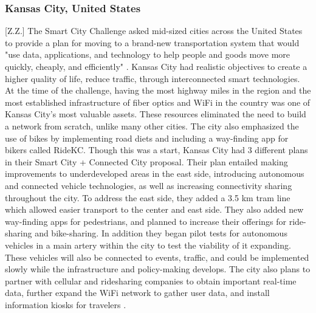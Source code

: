 \documentclass[12pt]{article}                       %
\begin{document}
\subsubsection{Kansas City, United States}[Z.Z.]
The Smart City Challenge asked mid-sized cities across the United States to provide a plan for moving to a brand-new transportation system that would "use data, applications, and technology to help people and goods move more quickly, cheaply, and efficiently" \cite{2016BeyondChallengeb}. Kansas City had realistic objectives to create a higher quality of life, reduce traffic, through interconnected smart technologies. At the time of the challenge, having the most highway miles in the region and the most established infrastructure of fiber optics and WiFi in the country was one of Kansas City's most valuable assets. These resources eliminated the need to build a network from scratch, unlike many other cities. The city also emphasized the use of bikes by implementing road diets and including a way-finding app for bikers called RideKC. Though this was a start, Kansas City had 3 different plans in their Smart City + Connected City proposal. Their plan entailed making improvements to underdeveloped areas in the east side, introducing autonomous and connected vehicle technologies, as well as increasing connectivity sharing throughout the city. To address the east side, they added a 3.5 km tram line which allowed easier transport to the center and east side. They also added new way-finding apps for pedestrians, and planned to increase their offerings for ride-sharing and bike-sharing. In addition they began pilot tests for autonomous vehicles in a main artery within the city to test the viability of it expanding. These vehicles will also be connected to events, traffic, and could be implemented slowly while the infrastructure and policy-making develops. The city also plans to partner with cellular and ridesharing companies to obtain important real-time data, further expand the WiFi network to gather user data, and install information kiosks for travelers \cite{2016BeyondChallengeb}.
\end{document}
